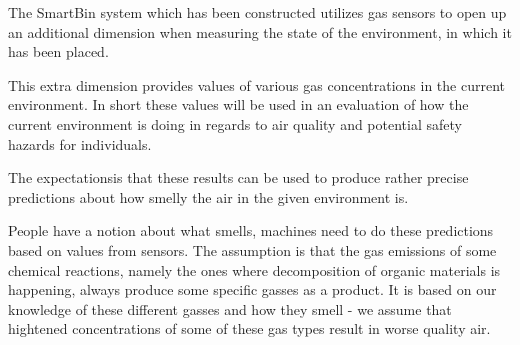 The SmartBin system which has been constructed utilizes gas sensors to open up an additional dimension when measuring the state of the environment, in which it has been placed.

This extra dimension provides values of various gas concentrations in the current environment.
In short these values will be used in an evaluation of how the current environment is doing in regards to air quality and potential safety hazards for individuals.

The expectationsis that these results can be used to produce rather precise predictions about how smelly the air in the given environment is.

People have a notion about what smells, machines need to do these predictions based on values from sensors.
The assumption is that the gas emissions of some chemical reactions, namely the ones where decomposition of organic materials is happening, always produce some specific gasses as a product.
It is based on our knowledge of these different gasses and how they smell - we assume that hightened concentrations of some of these gas types result in worse quality air.